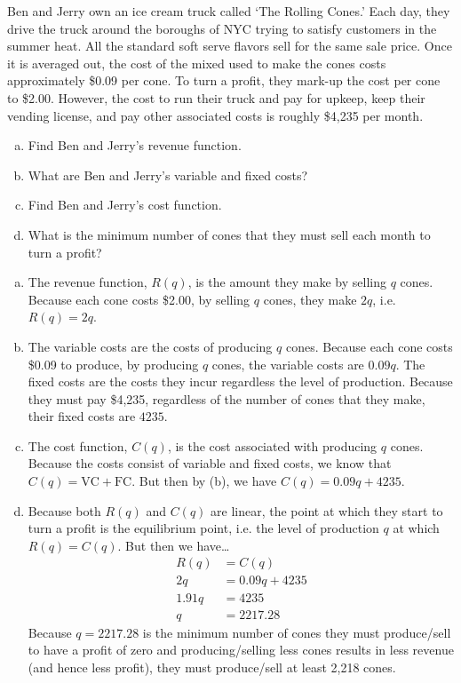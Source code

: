 \documentclass[11pt,letterpaper]{article}
\begin{document}
 Ben and Jerry own an ice cream truck called `The Rolling Cones.' Each day, they drive the truck around the boroughs of NYC trying to satisfy customers in the summer heat. All the standard soft serve flavors sell for the same sale price. Once it is averaged out, the cost of the mixed used to make the cones costs approximately \$0.09 per cone. To turn a profit, they mark-up the cost per cone to \$2.00. However, the cost to run their truck and pay for upkeep, keep their vending license, and pay other associated costs is roughly \$4,235 per month. 
	\begin{enumerate}[(a)]
	\item Find Ben and Jerry's revenue function.
	\item What are Ben and Jerry's variable and fixed costs?
	\item Find Ben and Jerry's cost function. 
	\item What is the minimum number of cones that they must sell each month to turn a profit?
	\end{enumerate} \pspace

\sol
\begin{enumerate}[(a)]
\item The revenue function, $R(q)$, is the amount they make by selling $q$ cones. Because each cone costs \$2.00, by selling $q$ cones, they make $2q$, i.e. $R(q)= 2q$. \pspace

\item The variable costs are the costs of producing $q$ cones. Because each cone costs \$0.09 to produce, by producing $q$ cones, the variable costs are $0.09q$. The fixed costs are the costs they incur regardless the level of production. Because they must pay \$4,235, regardless of the number of cones that they make, their fixed costs are $4235$. \pspace

\item The cost function, $C(q)$, is the cost associated with producing $q$ cones. Because the costs consist of variable and fixed costs, we know that $C(q)= \text{VC} + \text{FC}$. But then by (b), we have $C(q)= 0.09q + 4235$. \pspace

\item Because both $R(q)$ and $C(q)$ are linear, the point at which they start to turn a profit is the equilibrium point, i.e. the level of production $q$ at which $R(q)= C(q)$. But then we have\dots
	\[
	\begin{aligned}
	R(q)&= C(q) \\[0.3cm]
	2q&= 0.09q + 4235 \\[0.3cm]
	1.91q&= 4235 \\[0.3cm]
	q&= 2217.28
	\end{aligned}
	\]
Because $q= 2217.28$ is the minimum number of cones they must produce/sell to have a profit of zero and producing/selling less cones results in less revenue (and hence less profit), they must produce/sell at least 2,218 cones. 
\end{enumerate}
\end{document}
